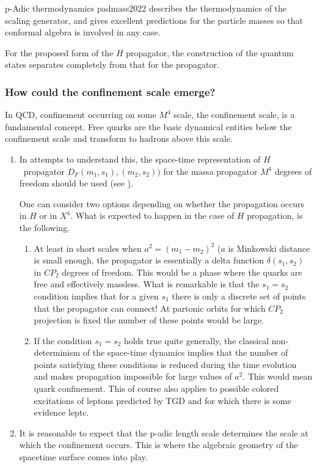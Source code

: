 \documentclass[10pt,epsf]{article}
\begin{document}
p-Adic thermodynamics  \cite{btart}{padmass2022} describes the thermodynamics of the scaling generator, and gives excellent predictions for the  particle masses so that conformal algebra is involved in any case. 

For the proposed form of the $H$ propagator, the construction of the quantum states separates completely from that for the propagator.


\subsubsection{How  could the confinement scale emerge?}

In QCD, confinement    occurring on some $M^4$   scale, the confinement scale, is a fundamental concept. Free  quarks are the basic dynamical entities  below the  confinement scale and  transform to hadrons above this scale. 

\begin{enumerate}

\item   In attempts to  understand this,   the space-time representation  of $H$ propagator $D_F(m_1,s_1),(m_2,s_2))$ for the massa propagator $M^4$ degrees of freedom should be used (see \href{https://en.wikipedia.org/wiki/Propagator}). 



One can consider two options depending on whether the propagation occurs in $H$ or  in $X^4$. What is expected to happen in the case of $H$ propagation, is the following.

\begin{enumerate}

\item At least in  short scales when $a^2=(m_1-m_2)^2$ ($a$ is Minkowski distance is small enough,  the propagator is essentially a delta function $\delta (s_1,s_2)$ in $CP_2$ degrees of freedom. This would be a phase where the quarks are free and effectively massless. What is remarkable is that the  $s_1=s_2$ condition implies that for a given $s_1$ there is only a discrete set of points that the propagator can connect! At partonic orbits for which $CP_2$ projection is fixed the number of these points would be large.
 

\item  If the condition $s_1=s_2$  holds true quite generally,  the classical non-determinism of the space-time dynamics implies that the number of points satisfying these conditions is  reduced  during  the time evolution and   makes propagation impossible for large values of $a^2$. This would mean  quark confinement. This of course also applies to possible colored excitations of leptons predicted by TGD and for which there is some evidence \cite{allb}{leptc}.
\end{enumerate}

\item It is reasonable to expect that the p-adic length scale determines the scale at which the confinement occurs. This is where the algebraic geometry of the spacetime surface comes into play.

\end{enumerate}
\end{document}
